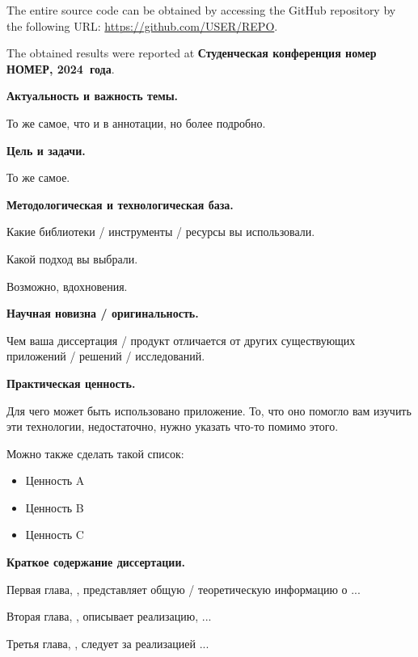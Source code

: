 \documentclass[a4paper,12pt]{report}
\newcommand{\conferencesList}{Студенческая конференция номер НОМЕР, \year~года}
\renewcommand{\year}{2024}
\newcommand{\github}{\url{https://github.com/USER/REPO}}
\begin{document}
The entire source code can be obtained by accessing the GitHub repository
by the following URL: \github. 

The obtained results were reported at \textbf{\conferencesList}\cite{self}.

\clearpage
{}
\begin{acronym}[JPEG]
\end{acronym}

\introChapter

\textbf{Актуальность и важность темы.}

То же самое, что и в аннотации, но более подробно.

\textbf{Цель и задачи.}

То же самое.

\textbf{Методологическая и технологическая база.}

Какие библиотеки / инструменты / ресурсы вы использовали.

Какой подход вы выбрали.

Возможно, вдохновения.

\textbf{Научная новизна / оригинальность.}

Чем ваша диссертация / продукт отличается от других существующих приложений / решений / исследований.

\textbf{Практическая ценность.}

Для чего может быть использовано приложение.
То, что оно помогло вам изучить эти технологии, недостаточно,
нужно указать что-то помимо этого.

Можно также сделать такой список:
\begin{itemize}
    \item Ценность A
    \item Ценность B
    \item Ценность C
\end{itemize}

\textbf{Краткое содержание диссертации.}

Первая глава, , представляет общую / теоретическую информацию о ...

Вторая глава, , описывает реализацию, ...

Третья глава, , следует за реализацией ...
\end{document}
